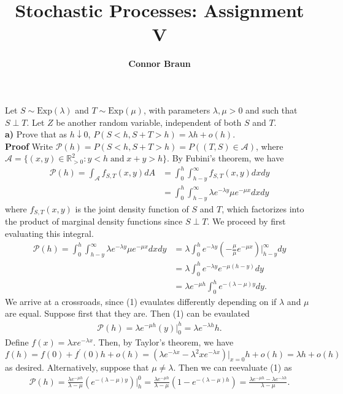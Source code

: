 \documentclass[11pt, letterpaper]{article}
\title{\bf Stochastic Processes: Assignment V}
\author{\bf Connor Braun}
\date{}
\newcommand{\mbb}[1]{\mathbb{#1}}
\newcommand{\mc}[1]{\mathcal{#1}}
\begin{document}
    \maketitle
     Let $S\sim\text{Exp}(\lambda)$ and $T\sim\text{Exp}(\mu)$, with parameters $\lambda,\mu>0$ and such that $S\perp T$. Let $Z$ be another random variable, independent
    of both $S$ and $T$.\\[10pt]
    {\bf a)} Prove that as $h\downarrow 0$, $P(S<h,S+T>h)=\lambda h+o(h)$.\\[10pt]
    {\bf Proof} Write $\mc{P}(h)=P(S<h,S+T>h)=P((T,S)\in\mc{A})$, where $\mc{A}=\{(x,y)\in\mbb{R}_{>0}^2:y<h\;\text{and}\;x+y>h\}$. By Fubini's theorem, we have
    \begin{align*}
        \mc{P}(h)=\int_\mc{A}f_{S,T}(x,y)dA&=\int_0^h\int_{h-y}^\infty f_{S,T}(x,y)dxdy\\
        &=\int_0^h\int_{h-y}^\infty \lambda e^{-\lambda y}\mu e^{-\mu x}dxdy\tag{factorization theorem}
    \end{align*}
    where $f_{S,T}(x,y)$ is the joint density function of $S$ and $T$, which factorizes into the product of marginal density functions since $S\perp T$. We proceed by first evaluating this integral.
    \begin{align*}
        \mc{P}(h)=\int_0^h\int_{h-y}^\infty \lambda e^{-\lambda y}\mu e^{-\mu x}dxdy
        &=\lambda\int_0^he^{-\lambda y}\left(-\frac{\mu}{\mu}e^{-\mu x}\right)\bigg|_{h-y}^\infty dy\\
        &=\lambda\int_0^he^{-\lambda y}e^{-\mu(h-y)}dy\\
        &=\lambda e^{-\mu h}\int_0^he^{-(\lambda-\mu)y}dy.\tag{1}
    \end{align*}
    We arrive at a crossroads, since (1) evaulates differently depending on if $\lambda$ and $\mu$ are equal. Suppose first that they are. Then (1) can be evaulated
    \begin{align*}
        \mc{P}(h)=\lambda e^{-\mu h}(y)\bigg|^h_0=\lambda e^{-\lambda h}h.
    \end{align*}
    Define $f(x)=\lambda xe^{-\lambda x}$. Then, by Taylor's theorem, we have
    \[f(h)=f(0)+f^\prime(0)h+o(h)=(\lambda e^{-\lambda x}-\lambda^2xe^{-\lambda x})\bigg|_{x=0}h+o(h)=\lambda h+o(h)\]
    as desired. Alternatively, suppose that $\mu\neq \lambda$. Then we can reevaluate (1) as
    \begin{align*}
        \mc{P}(h)=\frac{\lambda e^{-\mu h}}{\lambda-\mu}\left(e^{-(\lambda-\mu)y}\right)\bigg|_{h}^0=\frac{\lambda e^{-\mu h}}{\lambda-\mu}\left(1-e^{-(\lambda-\mu)h}\right)=\frac{\lambda e^{-\mu h}-\lambda e^{-\lambda h}}{\lambda - \mu}.
    \end{align*}
\end{document}
